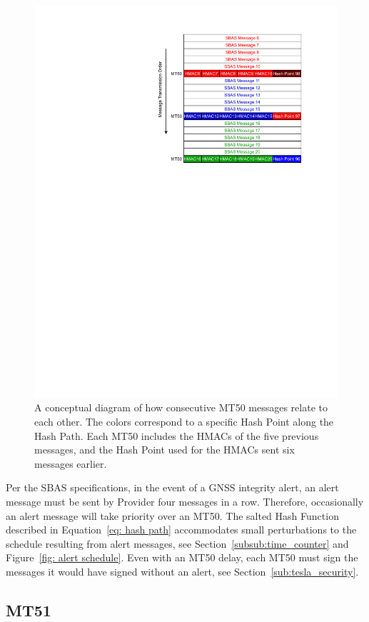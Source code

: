 \documentclass[letterpaper,times]{IONconf/IONconf}
\begin{document}
		\begin{figure}%
			\centering
			\includegraphics[width=0.5\linewidth]{fig/MT50Schedule.pdf}
			\caption{
				A conceptual diagram of how consecutive MT50 messages relate to each other.
				The colors correspond to a specific Hash Point along the Hash Path. Each MT50 includes the HMACs of the five previous messages, and the Hash Point used for the HMACs sent six messages earlier.
			}
			\label{fig: MT50 Schedule}
		\end{figure}

		Per the SBAS specifications, in the event of a GNSS integrity alert, an alert message must be sent by Provider four messages in a row.
		Therefore,  occasionally an alert message will take priority over an MT50.
		The salted Hash Function described in Equation~\eqref{eq: hash path} accommodates small perturbations to the schedule resulting from alert messages, see Section~\ref{subsub:time_counter} and Figure~\ref{fig: alert schedule}.
		Even with an MT50 delay, each MT50 must sign the messages it would have signed without an alert, see Section~\ref{sub:tesla_security}.

	\subsection{MT51} \label{sub:mt51}
\end{document}
